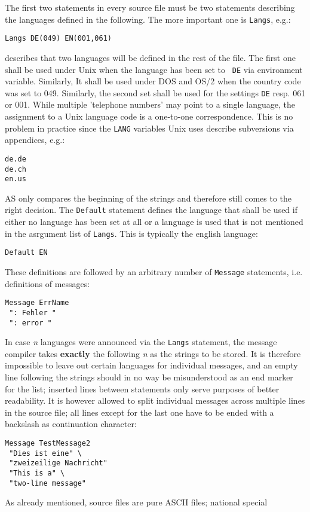 \documentclass[12pt,twoside]{report}
\begin{document}
The first two statements in every source file must be two statements
describing the languages defined in the following.  The more important one
is {\tt Langs}, e.g.:
\begin{verbatim}
Langs DE(049) EN(001,061)
\end{verbatim}
describes that two languages will be defined in the rest of the file.  The
first one shall be used under Unix when the language has been set to {\tt
DE} via environment variable.  Similarly, It shall be used under DOS and
OS/2 when the country code was set to 049.  Similarly, the second set
shall be used for the settings {\tt DE} resp. 061 or 001.  While multiple
'telephone numbers' may point to a single language, the assignment to a
Unix language code is a one-to-one correspondence.  This is no problem in
practice since the {\tt LANG} variables Unix uses describe subversions via
appendices, e.g.:
\begin{verbatim}
de.de
de.ch
en.us
\end{verbatim}
AS only compares the beginning of the strings and therefore still comes to
the right decision.
The {\tt Default} statement defines the language that shall be used if
either no language has been set at all or a language is used that is not
mentioned in the asrgument list of {\tt Langs}.  This is typically the
english language:
\begin{verbatim}
Default EN
\end{verbatim}
These definitions are followed by an arbitrary number of {\tt Message}
statements, i.e. definitions of messages:
\begin{verbatim}
Message ErrName
 ": Fehler "
 ": error "
\end{verbatim}
In case {\em n} languages were announced via the {\tt Langs} statement,
the message compiler takes {\bf exactly} the following {\em n} as the
strings to be stored.  It is therefore impossible to leave out certain
languages for individual messages, and an empty line following the strings
should in no way be misunderstood as an end marker for the list; inserted
lines between statements only serve purposes of better readability.  It is
however allowed to split individual messages across multiple lines in the
source file; all lines except for the last one have to be ended with a
backslash as continuation character:
\begin{verbatim}
Message TestMessage2
 "Dies ist eine" \
 "zweizeilige Nachricht"
 "This is a" \
 "two-line message"
\end{verbatim}
As already mentioned, source files are pure ASCII files; national special
\end{document}
